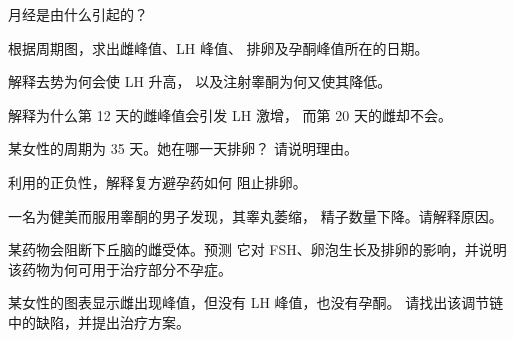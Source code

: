 \begin{exercise}[$\star$]\label{exo:g11:hormones-and-reproduction:5}
月经是由什么引起的？
\end{exercise}

\begin{exercise}[$\star\star$]\label{exo:g11:hormones-and-reproduction:6}
根据周期图，求出雌峰值、LH 峰值、
排卵及孕酮峰值所在的日期。
\end{exercise}

\begin{exercise}[$\star\star$]\label{exo:g11:hormones-and-reproduction:7}
解释去势为何会使 LH 升高，
以及注射睾酮为何又使其降低。
\end{exercise}

\begin{exercise}[$\star\star$]\label{exo:g11:hormones-and-reproduction:8}
解释为什么第 12 天的雌峰值会引发 LH 激增，
而第 20 天的雌却不会。
\end{exercise}

\begin{exercise}[$\star\star$]\label{exo:g11:hormones-and-reproduction:9}
某女性的周期为 35 天。她在哪一天排卵？
请说明理由。
\end{exercise}

\begin{exercise}[$\star\star$]\label{exo:g11:hormones-and-reproduction:10}
利用的正负性，解释复方避孕药如何
阻止排卵。
\end{exercise}

\begin{exercise}[$\star\star$]\label{exo:g11:hormones-and-reproduction:11}
一名为健美而服用睾酮的男子发现，其睾丸萎缩，
精子数量下降。请解释原因。
\end{exercise}

\begin{exercise}[$\star\star\star$]\label{exo:g11:hormones-and-reproduction:12}
某药物会阻断下丘脑的雌受体。预测
它对 FSH、卵泡生长及排卵的影响，并说明
该药物为何可用于治疗部分不孕症。
\end{exercise}

\begin{exercise}[$\star\star\star$]\label{exo:g11:hormones-and-reproduction:13}
某女性的图表显示雌出现峰值，但没有 LH 峰值，也没有孕酮。
请找出该调节链中的缺陷，并提出治疗方案。
\end{exercise}

